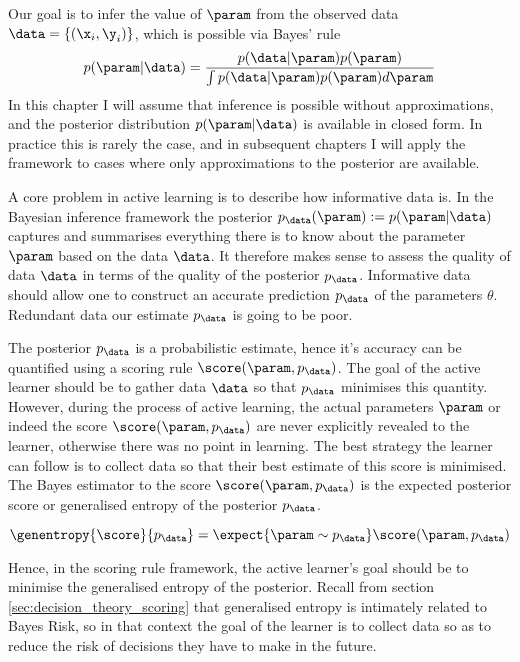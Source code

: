 Our goal is to infer the value of $\param$ from the observed data $\data = \{(\x_i,\y_i)\}$, which is possible via Bayes' rule
\begin{equation}
p(\param\vert\data) = \frac{p(\data\vert\param)p(\param)}{\int p(\data\vert\param)p(\param) d\param}
\end{equation}
In this chapter I will assume that inference is possible without approximations, and the posterior distribution $p(\param\vert\data)$ is available in closed form. In practice this is rarely the case, and in subsequent chapters I will apply the framework to cases where only approximations to the posterior are available.

A core problem in active learning is to describe how informative data is. In the Bayesian inference framework the posterior $p_\data(\param) := p(\param\vert\data)$ captures and summarises everything there is to know about the parameter $\param$ based on the data $\data$. It therefore makes sense to assess the quality of data $\data$ in terms of the quality of the posterior $p_\data$. Informative data should allow one to construct an accurate prediction $p_\data$ of the parameters $\theta$. Redundant data our estimate $p_\data$ is going to be poor.

The posterior $p_\data$ is a probabilistic estimate, hence it's accuracy can be quantified using a scoring rule $\score(\param,p_\data)$. The goal of the active learner should be to gather data $\data$ so that $p_\data$ minimises this quantity. However, during the process of active learning, the actual parameters $\param$ or indeed the score $\score(\param,p_\data)$ are never explicitly revealed to the learner, otherwise there was no point in learning. The best strategy the learner can follow is to collect data so that their best estimate of this score is minimised. The Bayes estimator to the score $\score(\param,p_\data)$ is the expected posterior score or generalised entropy of the posterior $p_\data$.

\begin{equation}
	\genentropy{\score}{p_\data} = \expect{\param\sim p_\data} \score(\param,p_\data)
\end{equation}

Hence, in the scoring rule framework, the active learner's goal should be to minimise the generalised entropy of the posterior. Recall from section \ref{sec:decision_theory_scoring} that generalised entropy is intimately related to Bayes Risk, so in that context the goal of the learner is to collect data so as to reduce the risk of decisions they have to make in the future.

